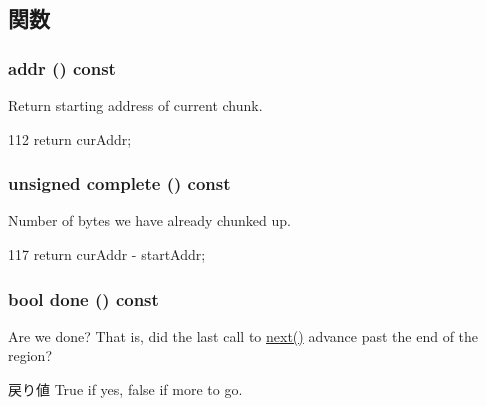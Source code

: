 \subsection{関数}
\hypertarget{classChunkGenerator_a4e8648f42b38341a268850a18c86830d}{
\subsubsection[{addr}]{ addr () const}}
\label{classChunkGenerator_a4e8648f42b38341a268850a18c86830d}
Return starting address of current chunk. 


\begin{DoxyCode}
112 { return curAddr; }
\end{DoxyCode}
\hypertarget{classChunkGenerator_a63320000d91910d20f33799285652714}{
\subsubsection[{complete}]{\setlength{\rightskip}{0pt plus 5cm}unsigned complete () const}}
\label{classChunkGenerator_a63320000d91910d20f33799285652714}
Number of bytes we have already chunked up. 


\begin{DoxyCode}
117 { return curAddr - startAddr; }
\end{DoxyCode}
\hypertarget{classChunkGenerator_a6db83072bdb45ff66ab856903170c40d}{
\subsubsection[{done}]{\setlength{\rightskip}{0pt plus 5cm}bool done () const}}
\label{classChunkGenerator_a6db83072bdb45ff66ab856903170c40d}
Are we done? That is, did the last call to \hyperlink{classChunkGenerator_a80870c233d0237e3588a2d6f8d176916}{next()} advance past the end of the region? \begin{DoxyReturn}{戻り値}
True if yes, false if more to go. 
\end{DoxyReturn}



